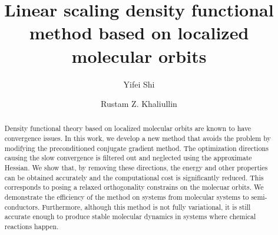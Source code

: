 \documentclass[prl,twocolumn,showpacs]{revtex4}
\begin{document}
\newcommand{\Ang}{\ensuremath{\mathring{\text{A}}}}
\newcommand{\ltwid}{\mathrel{\raise.3ex\hbox{$<$\kern-.75em\lower1ex\hbox{$\sim$}}}}
\newcommand{\gtwid}{\mathrel{\raise.3ex\hbox{$>$\kern-.75em\lower1ex\hbox{$\sim$}}}}
\newcommand{\bra}{\langle}
\newcommand{\ket}{\rangle}
\newcommand{\sill}{\psi}
\newcommand{\trace}{{\rm Tr}}
\newcommand{\ntilde}{\tilde{n}}
\newcommand{\stilde}{\tilde{s}}
\newcommand{\atilde}{\tilde{\alpha}}
\newcommand{\new}{\color{red}}
\newcommand{\old}{\color{black}}
\newcommand{\bea}{\begin{eqnarray}}
\newcommand{\eea}{\end{eqnarray}}
\newcommand{\br}{\ensuremath{\mathbf{r}}}
\def\nn{\nonumber\\}



\title{Linear scaling density functional method based on localized molecular orbits}

\author{Yifei Shi}

\author{Rustam Z. Khaliullin}


\begin{abstract}
Density functional theory based on localized molecular orbits are known to have convergence issues. In this work, we develop a new method that avoids the problem by modifying the preconditioned conjugate gradient method. The optimization directions causing the slow convergence is filtered out and neglected using the approximate Hessian. We show that, by removing these directions, the energy and other properties can be obtained accurately and the computational cost is significantly reduced. This corresponds to posing a relaxed orthogonality constrains on the molecuar orbits. We demonstrate the efficiency of the method on systems from molecular systems to semi-conductors. Furthermore, although this method is not fully variational, it is still accurate enough to produce stable molecular dynamics in systems where chemical reactions happen.

\end{abstract}
\maketitle
\end{document}
